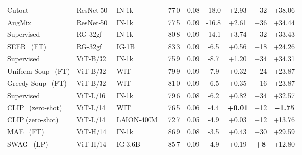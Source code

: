 \documentclass[10pt,twocolumn,letterpaper]{article}
\begin{document}
\begin{table*}[t]
\begin{adjustbox}{width=\linewidth}
\begin{tabular}{@{}lll|cc|cc|cc@{}}
Cutout~\cite{devries2017Improved,zhong2020AAAIConf.Artif.Intell.Random}     & ResNet-50    & IN-1k                       &  77.0  & 0.08                & -18.0 & +2.93  & +32 &  +38.06    \\
AugMix~\cite{hendrycks2020Int.Conf.Learn.Represent.AugMixa}     & ResNet-50    & IN-1k                       &  77.5  & 0.09                & -16.8 & +2.61  & +36 &  +34.44    \\
\midrule
Supervised     & RG-32gf      & IN-1k                       & 80.8  &   0.09                    & -14.1  &  +3.74     & +32 &     +33.43       \\
SEER~\cite{goyal2022Vision} (FT) & RG-32gf~\cite{radosavovic2020IEEECVFConf.Comput.Vis.PatternRecognit.CVPRDesigning}      & IG-1B~\cite{goyal2022Vision}  & 83.3 &    0.09                    & -6.5  &  +0.56       & +18   &  +24.26        \\
\midrule
Supervised       & ViT-B/32~\cite{dosovitskiy2021Int.Conf.Learn.Represent.Image}     & IN-1k      & 75.9     & 0.09      & -8.7         & +1.20              & +34        & +34.31                      \\
Uniform Soup~\cite{wortsman2022Int.Conf.Mach.Learn.Model} (FT) & ViT-B/32        & WIT~\cite{radford2021Int.Conf.Mach.Learn.Learning}   & 79.9       &   0.09      & -7.9  &  +0.32      & +24  &   +23.87        \\ Greedy Soup~\cite{wortsman2022Int.Conf.Mach.Learn.Model} (FT) & ViT-B/32        & WIT  & 81.0       &   0.09      & -6.5  &  +0.35      & +16  &   +23.87        \\
\midrule
Supervised    & ViT-L/16        & IN-1k   & 79.6    &   0.08      & -6.2 & +0.82 & +34 & +32.57 \\
CLIP~\cite{radford2021Int.Conf.Mach.Learn.Learning} (zero-shot)   & ViT-L/14        & WIT                     & 76.5    &   0.06                  & -4.4   &  \textbf{+0.01}     & +12   & \textbf{+1.75} \\
CLIP (zero-shot)    & ViT-L/14        & LAION-400M~\cite{schuhmann2021Adv.NeuralInf.Process.Syst.WorkshopLAION400M}                      & 72.7   &    0.05                  & -4.9   &   +0.03    & +12 & +13.76  \\ \midrule
MAE~\cite{he2022IEEECVFConf.Comput.Vis.PatternRecognit.CVPRMasked} (FT)    & ViT-H/14        & IN-1k                    & 86.9  &     0.08                  & -3.5 & +0.43 & +30     &  +29.59    \\
SWAG~\cite{singh2022IEEECVFConf.Comput.Vis.PatternRecognit.CVPRRevisiting} (LP)    & ViT-H/14        & IG-3.6B~\cite{singh2022IEEECVFConf.Comput.Vis.PatternRecognit.CVPRRevisiting}                    & 85.7    &   0.09                  & -4.9 & +0.19 & \textbf{+8} & +12.80 \\

\end{tabular}
\end{adjustbox}
\end{table*}
\end{document}
